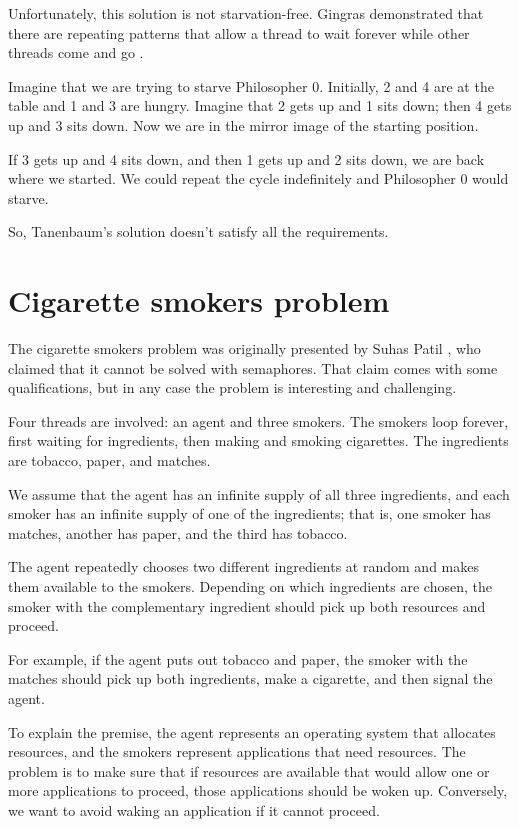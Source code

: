 \documentclass{book}
\newcommand{\clearemptydoublepage}{\newpage\cleardoublepage}
\begin{document}
Unfortunately, this solution is not starvation-free.  Gingras
demonstrated that there are repeating patterns that allow a
thread to wait forever while other threads come and go
\cite{gingras90dining}.

Imagine that we are trying to starve Philosopher 0.  Initially,
2 and 4 are at the table and 1 and 3 are hungry.  Imagine that 2 gets up and
1 sits down; then 4 gets up and 3 sits down.
Now we are in the mirror image of the starting position.

If 3 gets up and 4 sits
down, and then 1 gets up and 2 sits down, we are back
where we started.  We could repeat the cycle indefinitely and
Philosopher 0 would starve.

So, Tanenbaum's solution doesn't satisfy all the requirements.




\clearemptydoublepage
\section {Cigarette smokers problem}

The cigarette smokers problem was originally presented by
Suhas Patil \cite{patil}, who claimed that it cannot be solved with
semaphores.  That claim comes with some qualifications, but in
any case the problem is interesting and challenging.

Four threads are involved: an agent and three smokers.  The smokers
loop forever, first waiting for ingredients, then making and smoking
cigarettes.  The ingredients are tobacco, paper, and matches.

We assume that the agent has an infinite supply of all three
ingredients, and each smoker has an infinite supply of one of
the ingredients; that is, one smoker has matches, another has
paper, and the third has tobacco.

The agent repeatedly chooses two different ingredients at random
and makes them available to the smokers.  Depending on which
ingredients are chosen, the smoker with the complementary ingredient
should pick up both resources and proceed.

For example, if the agent puts out tobacco and paper, the
smoker with the matches should pick up both ingredients, make
a cigarette, and then signal the agent.

To explain the premise, the agent represents an operating system that
allocates resources, and the smokers represent applications that need
resources.  The problem is to make sure that if resources are
available that would allow one or more applications to proceed,
those applications should be woken up.  Conversely, we want to avoid
waking an application if it cannot proceed.
\end{document}

